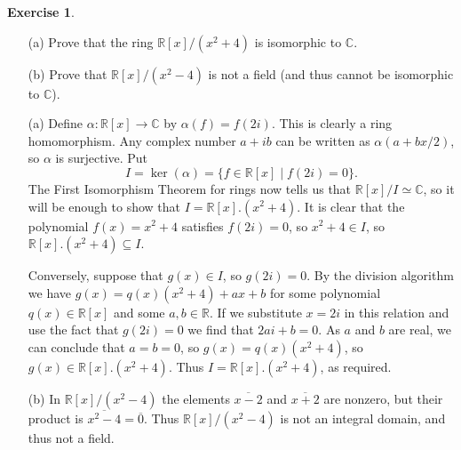 \documentclass{amsart}
\newcommand{\C}         {{\mathbb{C}}}
\newcommand{\R}         {{\mathbb{R}}}
\newcommand{\al}        {\alpha}
\newcommand{\ov}[1]     {\overline{#1}}
\newcommand{\sse}       {\subseteq}
\newcommand{\xra}       {\xrightarrow}
\newcommand{\st}        {\;|\;}
\renewcommand{\:}{\colon}
\theoremstyle{definition}
\newtheorem{exercise}{Exercise}[section]
\renewenvironment{solution}{\SolutionAtEnd}{\endSolutionAtEnd}
\begin{document}
\begin{exercise}
 \begin{itemize}
  \item[(a)] Prove that the ring $\R[x]/(x^2+4)$ is isomorphic to
   $\C$.
  \item[(b)] Prove that $\R[x]/(x^2-4)$ is not a field (and thus
   cannot be isomorphic to $\C$).
 \end{itemize}
\end{exercise}
\begin{solution}
 \begin{itemize}
  \item[(a)] Define $\al\:\R[x]\xra{}\C$ by $\al(f)=f(2i)$.  This is
   clearly a ring homomorphism.  Any complex number $a+ib$ can be
   written as $\al(a+bx/2)$, so $\al$ is surjective.  Put
   \[ I=\ker(\al)= \{f\in\R[x]\st f(2i)=0\}. \]
   The First Isomorphism Theorem for rings now tells us that
   $\R[x]/I\simeq\C$, so it will be enough to show that
   $I=\R[x].(x^2+4)$.  It is clear that the polynomial $f(x)=x^2+4$
   satisfies $f(2i)=0$, so $x^2+4\in I$, so $\R[x].(x^2+4)\sse I$.

   Conversely, suppose that $g(x)\in I$, so $g(2i)=0$.  By the
   division algorithm we have $g(x)=q(x)(x^2+4)+ax+b$ for some
   polynomial $q(x)\in\R[x]$ and some $a,b\in\R$.  If we substitute
   $x=2i$ in this relation and use the fact that $g(2i)=0$ we find
   that $2ai+b=0$.  As $a$ and $b$ are real, we can conclude that
   $a=b=0$, so $g(x)=q(x)(x^2+4)$, so $g(x)\in\R[x].(x^2+4)$.  Thus
   $I=\R[x].(x^2+4)$, as required.
  \item[(b)] In $\R[x]/(x^2-4)$ the elements $\ov{x-2}$ and $\ov{x+2}$
   are nonzero, but their product is $\ov{x^2-4}=\ov{0}$.  Thus
   $\R[x]/(x^2-4)$ is not an integral domain, and thus not a field.
 \end{itemize}
\end{solution}
\end{document}
